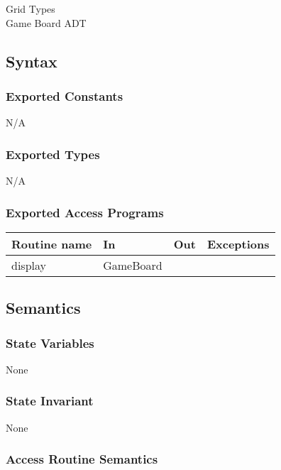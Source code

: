 \documentclass[12pt]{article}
\begin{document}
Grid Types \\
Game Board ADT

\subsection* {Syntax}

\subsubsection* {Exported Constants}

N/A
 
\subsubsection* {Exported Types}

N/A

\subsubsection* {Exported Access Programs}

\begin{tabular}{| l | l | l | l |}
\hline
\textbf{Routine name} & \textbf{In} & \textbf{Out} & \textbf{Exceptions}\\
\hline
display  & GameBoard & &  \\
\hline
\end{tabular}

\subsection* {Semantics}

\subsubsection* {State Variables}

None

\subsubsection* {State Invariant}

None

\subsubsection* {Access Routine Semantics}
\end{document}
